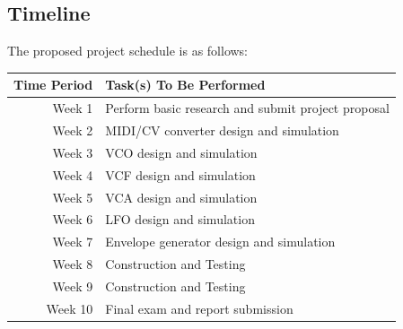 \documentclass[10pt,a4paper]{article}
\begin{document}
		\subsection{Timeline}
			The proposed project schedule is as follows:\\
			\begin{center}
				\begin{tabular}{|r|l|}
					\hline
					\bf{Time Period} & \bf{Task(s) To Be Performed} \\
					\hline
					Week 1 & Perform basic research and submit project proposal\\
					\hline
					Week 2 &  MIDI/CV converter design and simulation\\
					\hline
					Week 3 &  VCO design and simulation\\
					\hline
					Week 4 &  VCF design and simulation\\
					\hline
					Week 5 &  VCA design and simulation\\
					\hline
					Week 6 &  LFO design and simulation\\
					\hline
					Week 7 &  Envelope generator design and simulation\\
					\hline
					Week 8 &  Construction and Testing\\
					\hline
					Week 9 &  Construction and Testing\\
					\hline
					Week 10 &  Final exam and report submission\\
					\hline
				\end{tabular}
		\end{center}
		
\end{document}
